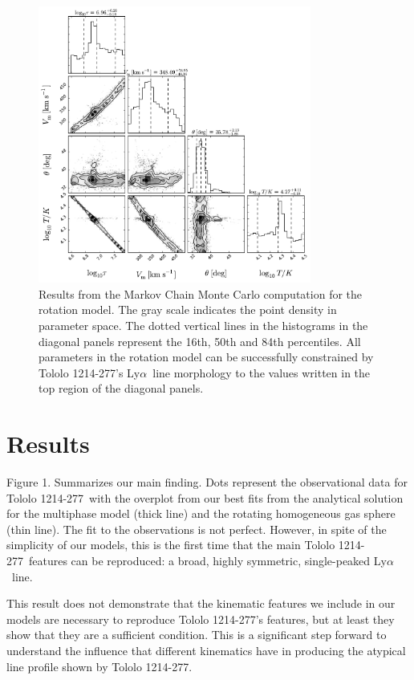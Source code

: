 \documentclass[a4paper,fleqn,usenatbib]{mnras}
\newcommand{\tol}{Tololo 1214-277}
\newcommand{\lya}{\ifmmode{{\rm Ly}\alpha}\else Ly$\alpha$\ \fi}
\begin{document}
\begin{figure}
\begin{center}
\includegraphics[width=0.8\textwidth]{emcee_results.pdf}
\caption{Results from the Markov Chain Monte Carlo computation for
    the rotation model. 
    The gray scale indicates the point density in parameter space. 
    The dotted vertical lines in the histograms in the diagonal panels
    represent the 16th, 50th and 84th percentiles. 
    All parameters in the rotation model can be successfully constrained by \tol's
    \lya line morphology to the values written in the top region of
    the diagonal panels.
    \label{emceeresults}} 
\end{center}
\end{figure}


\section{Results}


Figure 1. Summarizes our main finding.
Dots represent the observational data for \tol\ with the
overplot from our best fits from the analytical solution for the
multiphase model (thick line)  and the rotating homogeneous gas sphere
(thin line). 
The fit to the observations is not perfect. 
However, in spite of the
simplicity of our models, this is the first time that the main
\tol\ features can be reproduced: a broad, highly symmetric,
single-peaked \lya line. 

This result does not demonstrate that the kinematic features we
include in our models are necessary to reproduce \tol's features, but
at least they show that they are a sufficient condition.
This is a significant step forward to understand the influence that
different kinematics have in producing the atypical line profile shown
by \tol.
\end{document}
